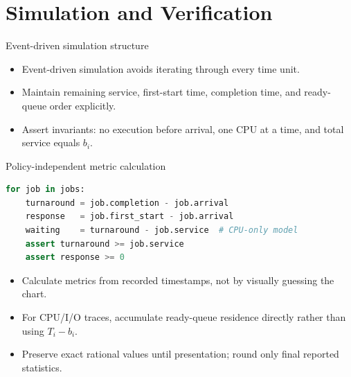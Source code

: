 \documentclass[aspectratio=169,11pt]{beamer}
\begin{document}
\section{Simulation and Verification}

\begin{frame}{Event-driven simulation structure}
  \centering
  \begin{itemize}
    \item Event-driven simulation avoids iterating through every time unit.
    \item Maintain remaining service, first-start time, completion time, and ready-queue order explicitly.
    \item Assert invariants: no execution before arrival, one CPU at a time, and total service equals $b_i$.
  \end{itemize}
\end{frame}

\begin{frame}[fragile]{Policy-independent metric calculation}
\begin{lstlisting}[language=Python]
for job in jobs:
    turnaround = job.completion - job.arrival
    response   = job.first_start - job.arrival
    waiting    = turnaround - job.service  # CPU-only model
    assert turnaround >= job.service
    assert response >= 0
\end{lstlisting}
  \begin{itemize}
    \item Calculate metrics from recorded timestamps, not by visually guessing the chart.
    \item For CPU/I/O traces, accumulate ready-queue residence directly rather than using $T_i-b_i$.
    \item Preserve exact rational values until presentation; round only final reported statistics.
  \end{itemize}
\end{frame}
\end{document}
